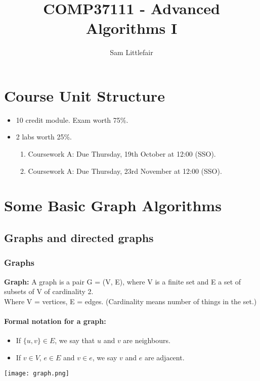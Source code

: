 \documentclass[11pt]{article}
\title{COMP37111 - Advanced Algorithms I}
\author{Sam Littlefair}
\begin{document}
\maketitle

\section{Course Unit Structure}
\begin{itemize}
  \item 10 credit module. Exam worth 75\%.
  \item 2 labs worth 25\%.
  \begin{enumerate}
    \item Coursework A: Due Thursday, 19th October at 12:00 (SSO).
    \item Coursework A: Due Thursday, 23rd November at 12:00 (SSO).
  \end{enumerate}
\end{itemize}

\section{Some Basic Graph Algorithms}
\subsection{Graphs and directed graphs}
\subsubsection{Graphs}
\textbf{Graph:} A graph is a pair G = (V, E), where V is a finite set and E a
set of subsets of V of cardinality 2. \\ \hspace*{14mm} Where V = vertices, E = edges. (Cardinality means number of things in the set.)
\paragraph{Formal notation for a graph:}
\begin{itemize}
    \item If $\{u, v\} \in E$, we say that $u$ and $v$ are neighbours.
    \item If $v \in V$, $e \in E$ and $v \in e$, we say $v$ and $e$ are adjacent.
\end{itemize}
\begin{center}
    \texttt{[image: graph.png]}
\end{center}
\newpage
\end{document}
